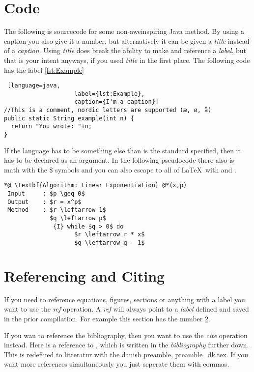 \documentclass[a4, english]{article}
\begin{document}
\section{Code}
The following is sourcecode for some non-aweinspiring Java method. By using a
caption you also give it a number, but alternatively it can be given a
\emph{title} instead of a \emph{caption}. Using \emph{title} does break the
ability to make and reference a \emph{label}, but that is your intent anyways,
if you used \emph{title} in the first place. The following code has the label
\ref{lst:Example}

\begin{lstlisting} [language=java,
                    label={lst:Example},
                    caption={I'm a caption}]
//This is a comment, nordic letters are supported (æ, ø, å)
public static String example(int n) {
  return "You wrote: "+n;
}
\end{lstlisting}

If the language has to be something else than is the standard specified, then it
has to be declared as an argument. In the following pseudocode there also is
math with the \$ symbols and you can also escape to all of \LaTeX\ with
 and .

\begin{lstlisting}[firstnumber=1,
                   caption={The algorithm \emph{linear exponentiation}},
                   label={lst:algorithm}]
*@ \textbf{Algorithm: Linear Exponentiation} @*(x,p)
 Input     : $p \geq 0$
 Output    : $r = x^p$
 Method    : $r \leftarrow 1$
             $q \leftarrow p$
              {I} while $q > 0$ do
                    $r \leftarrow r * x$
                    $q \leftarrow q - 1$
\end{lstlisting}

\section{Referencing and Citing} \label{sec:ref}
If you need to reference equations, figures, sections or anything with a label
you want to use the \emph{ref} operation. A \emph{ref} will always point to a
\emph{label} defined and saved in the prior compilation. For example this
section has the number \ref{sec:ref}.

If you wan to reference the bibliography, then you want to use the \emph{cite}
operation instead. Here is a reference to \cite{hansen2020}, which is written in
the \emph{bibliography} further down. This is redefined to litteratur with the
danish preamble, preamble\_dk.tex. If you want more references simultaneously
you just seperate them with commas.
\end{document}

